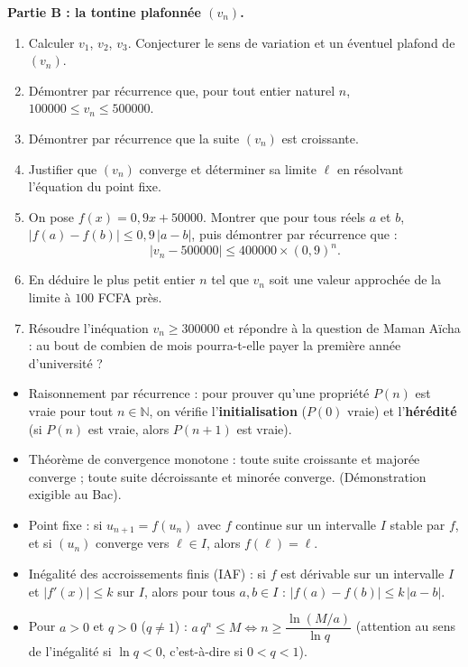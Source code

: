\documentclass[11pt]{article}
\newcommand{\cle}[1]{{\popxbold\color{popdark}#1}}
\newcounter{popsec}
\newcounter{popsub}
\newcommand{\courssub}[1]{%
  \stepcounter{popsub}%
  \par\vspace{9pt}\noindent{\popxbold\fontsize{11.5}{13}\selectfont\color{popink}{\color{poporange}\thepopsec.\thepopsub}\hspace{6pt}#1}\par\nopagebreak\vspace{4pt}
}
\begin{document}
\textbf{Partie B : la tontine plafonnée $(v_n)$.}

\begin{enumerate}
\item Calculer $v_1$, $v_2$, $v_3$. Conjecturer le sens de variation et un éventuel plafond de $(v_n)$.
\item Démontrer par récurrence que, pour tout entier naturel $n$, $\num{100000} \leq v_n \leq \num{500000}$.
\item Démontrer par récurrence que la suite $(v_n)$ est croissante.
\item Justifier que $(v_n)$ converge et déterminer sa limite $\ell$ en résolvant l'équation du point fixe.
\item On pose $f(x)=0{,}9x+\num{50000}$. Montrer que pour tous réels $a$ et $b$, $|f(a)-f(b)| \leq 0{,}9\,|a-b|$, puis démontrer par récurrence que :
\[ |v_n - \num{500000}| \leq \num{400000}\times (0{,}9)^n. \]
\item En déduire le plus petit entier $n$ tel que $v_n$ soit une valeur approchée de la limite à $100$ FCFA près.
\item Résoudre l'inéquation $v_n \geq \num{300000}$ et répondre à la question de Maman Aïcha : au bout de combien de mois pourra-t-elle payer la première année d'université ?
\end{enumerate}

\courssub{Ressources à mobiliser}

\begin{aretenir}
\begin{itemize}
\item \cle{Raisonnement par récurrence} : pour prouver qu'une propriété $P(n)$ est vraie pour tout $n\in\mathbb{N}$, on vérifie l'\textbf{initialisation} ($P(0)$ vraie) et l'\textbf{hérédité} (si $P(n)$ est vraie, alors $P(n+1)$ est vraie).
\item \cle{Théorème de convergence monotone} : toute suite croissante et majorée converge ; toute suite décroissante et minorée converge. (Démonstration exigible au Bac).
\item \cle{Point fixe} : si $u_{n+1}=f(u_n)$ avec $f$ continue sur un intervalle $I$ stable par $f$, et si $(u_n)$ converge vers $\ell \in I$, alors $f(\ell)=\ell$.
\item \cle{Inégalité des accroissements finis (IAF)} : si $f$ est dérivable sur un intervalle $I$ et $|f'(x)|\leq k$ sur $I$, alors pour tous $a,b\in I$ : $|f(a)-f(b)|\leq k\,|a-b|$.
\item Pour $a>0$ et $q>0$ ($q\neq 1$) : $a\,q^n \leq M \iff n \geq \dfrac{\ln(M/a)}{\ln q}$ (attention au sens de l'inégalité si $\ln q < 0$, c'est-à-dire si $0<q<1$).
\end{itemize}
\end{aretenir}
\end{document}

